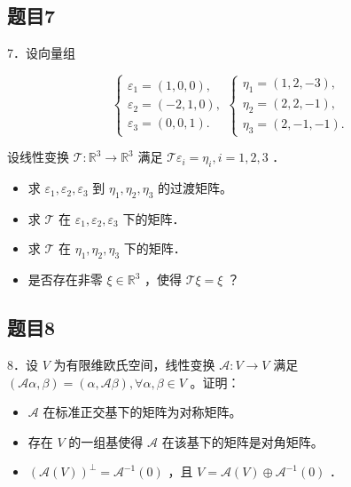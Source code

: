 \documentclass{article}
\begin{document}
\subsection{题目7}
7．设向量组

\[
\left\{\begin{array} { l } 
{ \varepsilon _ { 1 } = ( 1 , 0 , 0 ) , } \\
{ \varepsilon _ { 2 } = ( - 2 , 1 , 0 ) , } \\
{ \varepsilon _ { 3 } = ( 0 , 0 , 1 ) . }
\end{array} \left\{\begin{array}{l}
\eta_{1}=(1,2,-3), \\
\eta_{2}=(2,2,-1), \\
\eta_{3}=(2,-1,-1) .
\end{array}\right.\right.
\]

设线性变换 \(\mathcal{T}: \mathbb{R}^{3} \rightarrow \mathbb{R}^{3}\) 满足 \(\mathcal{T} \varepsilon_{i}=\eta_{i}, i=1,2,3\) ．

\begin{itemize}
  \item[（1）] 求 \(\varepsilon_{1}, \varepsilon_{2}, \varepsilon_{3}\) 到 \(\eta_{1}, \eta_{2}, \eta_{3}\) 的过渡矩阵。
  \item[（2）] 求 \(\mathcal{T}\) 在 \(\varepsilon_{1}, \varepsilon_{2}, \varepsilon_{3}\) 下的矩阵．
  \item[（3）] 求 \(\mathcal{T}\) 在 \(\eta_{1}, \eta_{2}, \eta_{3}\) 下的矩阵．
  \item[（4）] 是否存在非零 \(\xi \in \mathbb{R}^{3}\) ，使得 \(\mathcal{T} \xi=\xi\) ？
\end{itemize}

\subsection{题目8}
8．设 \(V\) 为有限维欧氏空间，线性变换 \(\mathcal{A}: V \rightarrow V\) 满足 \((\mathcal{A} \alpha, \beta)=(\alpha, \mathcal{A} \beta), \forall \alpha, \beta \in V\) 。证明：

\begin{itemize}
  \item[（1）] \(\mathcal{A}\) 在标准正交基下的矩阵为对称矩阵。
  \item[（2）] 存在 \(V\) 的一组基使得 \(\mathcal{A}\) 在该基下的矩阵是对角矩阵。
  \item[（3）] \((\mathcal{A}(V))^{\perp}=\mathcal{A}^{-1}(0)\) ，且 \(V=\mathcal{A}(V) \oplus \mathcal{A}^{-1}(0)\) ．
\end{itemize}
\end{document}
